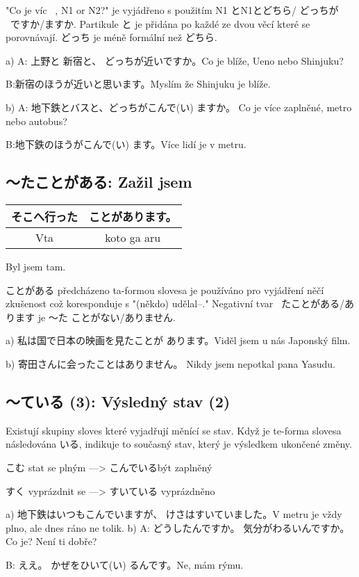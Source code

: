 "Co je víc ~, N1 or N2?" je vyjádřeno s použitím N1 とN1とどちら/ どっちが
~ですか/ますか. Partikule  と  je přidána po každé ze dvou věcí které se porovnávají. どっち je méně formální než どちら.


a) A: 上野と 新宿と、 どっちが近いですか。Co je blíže, Ueno nebo Shinjuku?

B:新宿のほうが近いと思います。Myslím že Shinjuku je blíže.

b) A: 地下鉄とバスと、どっちがこんで(い) ますか。 Co je více zaplněné, metro nebo autobus?

B:地下鉄のほうがこんで(い) ます。Více lidí je v metru.

\subsection{〜たことがある: Zažil jsem}
\begin{center}
\begin{tabular}{|c|c|}
\hline
そこへ行った &ことがあります。\\
\hline
Vta&koto ga aru\\
\hline
\end{tabular}
\end{center}
Byl jsem tam.

ことがある předcházeno ta-formou slovesa je používáno pro vyjádření něčí zkušenost což koresponduje s "(někdo) udělal--." Negativní tvar  ~たことがある/あります  je 〜た ことがない/ありません.

a) 私は国で日本の映画を見たことが あります。Viděl jsem u nás Japonský film.

b) 寄田さんに会ったことはありません。 Nikdy jsem nepotkal pana Yasudu.

\subsection{ 〜ている (3): Výsledný stav (2)}
Existují skupiny sloves které vyjadřují měnící se stav. Když je te-forma slovesa následována いる, indikuje to současný stav, který je výsledkem ukončené změny.

こむ stat se plným ––> こんでいるbýt zaplněný

すく vyprázdnit se ––> すいている vyprázdněno

a) 地下鉄はいつもこんでいますが、 けさはすいていました。V metru je vždy plno, ale dnes ráno ne tolik.
b) A: どうしたんですか。 気分がわるいんですか。Co je? Není ti dobře?

B: ええ。 かぜをひいて(い) るんです。Ne, mám rýmu.


